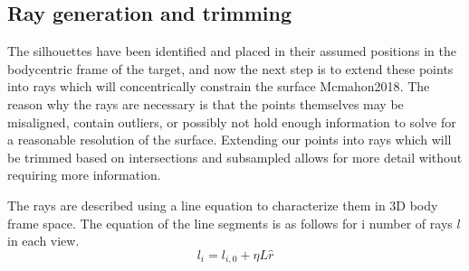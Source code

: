 \subsection{Ray generation and trimming}


The silhouettes have been identified and placed in their assumed positions in the bodycentric frame of the target, and now the next step is to extend these points into rays which will concentrically constrain the surface {Mcmahon2018}. The reason why the rays are necessary is that the points themselves may be misaligned, contain outliers, or possibly not hold enough information to solve for a reasonable resolution of the surface. Extending our points into rays which will be trimmed based on intersections and subsampled allows for more detail without requiring more information. 


The rays are described using a line equation to characterize them in 3D body frame space. The equation of the line segments is as follows for i number of rays $l$ in each view. 
\begin{equation}
    l_i = l_{i,0} + \eta L \hat{r}
\end{equation}


